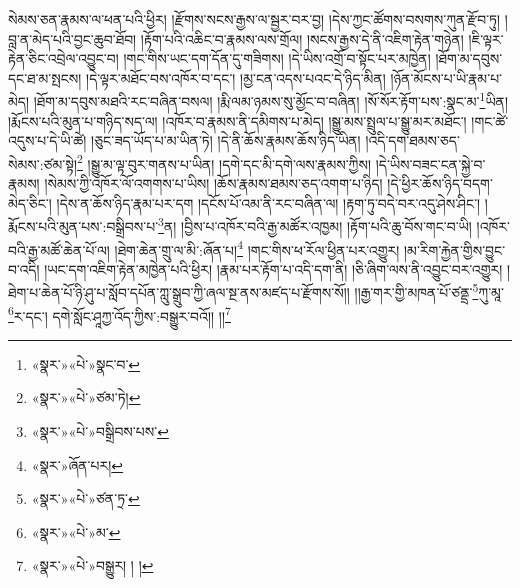 སེམས་ཅན་རྣམས་ལ་ཕན་པའི་ཕྱིར། །རྫོགས་སངས་རྒྱས་ལ་སྦྱར་བར་བྱ། །དེས་ཀྱང་ཚོགས་བསགས་ཀུན་རྫོབ་ཏུ། །བླ་ན་མེད་པའི་བྱང་ཆུབ་ཐོབ། །རྟོག་པའི་འཆིང་བ་རྣམས་ལས་གྲོལ། །སངས་རྒྱས་དེ་ནི་འཇིག་རྟེན་གཉེན། །ཇི་ལྟར་རྟེན་ཅིང་འབྲེལ་འབྱུང་བ། །གང་གིས་ཡང་དག་དོན་དུ་གཟིགས། །དེ་ཡིས་འགྲོ་བ་སྟོང་པར་མཁྱེན། །ཐོག་མ་དབུས་དང་ཐ་མ་སྤངས། །དེ་ལྟར་མཐོང་བས་འཁོར་བ་དང་། །མྱ་ངན་འདས་པའང་དེ་ཉིད་མིན། །ཉོན་མོངས་པ་ཡི་རྣམ་པ་མེད། །ཐོག་མ་དབུས་མཐའི་རང་བཞིན་བསལ། །རྨི་ལམ་ཉམས་སུ་མྱོང་བ་བཞིན། །སོ་སོར་རྟོག་པས་:སྣང་མ་\footnote{«སྣར་»«པེ་»སྣང་བ་}ཡིན། །རྨོངས་པའི་མུན་པ་གཉིད་སད་ལ། །འཁོར་བ་རྣམས་ནི་དམིགས་པ་མེད། །སྒྱུ་མས་སྤྲུལ་པ་སྒྱུ་མར་མཐོང་། །གང་ཚེ་འདུས་པ་དེ་ཡི་ཚེ། །ཅུང་ཟད་ཡོད་པ་མ་ཡིན་ཏེ། །དེ་ནི་ཆོས་རྣམས་ཆོས་ཉིད་ཡིན། །འདི་དག་ཐམས་ཅད་སེམས་:ཙམ་སྟེ།\footnote{«སྣར་»«པེ་»ཙམ་ཏེ།} །སྒྱུ་མ་ལྟ་བུར་གནས་པ་ཡིན། །དགེ་དང་མི་དགེ་ལས་རྣམས་ཀྱིས། །དེ་ཡིས་བཟང་ངན་སྐྱེ་བ་རྣམས། །སེམས་ཀྱི་འཁོར་ལོ་འགགས་པ་ཡིས། །ཆོས་རྣམས་ཐམས་ཅད་འགག་པ་ཉིད། །དེ་ཕྱིར་ཆོས་ཉིད་བདག་མེད་ཅིང་། །དེས་ན་ཆོས་ཉིད་རྣམ་པར་དག །དངོས་པོ་འམ་ནི་རང་བཞིན་ལ། །རྟག་ཏུ་བདེ་བར་འདུ་ཤེས་ཤིང་། །རྨོངས་པའི་མུན་པས་:བསྒྲིབས་པ་\footnote{«སྣར་»«པེ་»བསྒྲིབས་པས་}ན། །བྱིས་པ་འཁོར་བའི་རྒྱ་མཚོར་འཁྱམ། །རྟོག་པའི་ཆུ་བོས་གང་བ་ཡི། །འཁོར་བའི་རྒྱ་མཚོ་ཆེན་པོ་ལ། །ཐེག་ཆེན་གྲུ་ལ་མི་:ཞོན་པ།\footnote{«སྣར་»ཞོན་པར།} །གང་གིས་ཕ་རོལ་ཕྱིན་པར་འགྱུར། །མ་རིག་རྐྱེན་གྱིས་བྱུང་བ་འདི། །ཡང་དག་འཇིག་རྟེན་མཁྱེན་པའི་ཕྱིར། །རྣམ་པར་རྟོག་པ་འདི་དག་ནི། །ཅི་ཞིག་ལས་ནི་འབྱུང་བར་འགྱུར། །ཐེག་པ་ཆེན་པོ་ཉི་ཤུ་པ་སློབ་དཔོན་ཀླུ་སྒྲུབ་ཀྱི་ཞལ་སྔ་ནས་མཛད་པ་རྫོགས་སོ།། །།རྒྱ་གར་གྱི་མཁན་པོ་ཙནྡྲ་\footnote{«སྣར་»«པེ་»ཙན་ཏྲ་}ཀུ་མཱ་\footnote{«སྣར་»«པེ་»མ་}ར་དང་། དགེ་སློང་ཤཱཀྱ་འོད་ཀྱིས་:བསྒྱུར་བའོ།། །།\footnote{«སྣར་»«པེ་»བསྒྱུར། ། །}